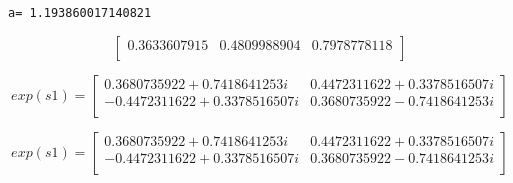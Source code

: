 \documentclass[11pt]{article}
\begin{document}
    \begin{Verbatim}[commandchars=\\\{\}]
a= 1.193860017140821
    \end{Verbatim}

    $$

\begin{bmatrix}
0.3633607915 & 0.4809988904 & 0.7978778118  \\
 \end{bmatrix}
$$

    
    $$
exp(s1)=
\begin{bmatrix}
0.3680735922 + 0.7418641253 i & 0.4472311622 + 0.3378516507 i  \\
 -0.4472311622 + 0.3378516507 i & 0.3680735922 - 0.7418641253 i  \\
 \end{bmatrix}
$$

    
    $$
exp(s1)=
\begin{bmatrix}
0.3680735922 + 0.7418641253 i & 0.4472311622 + 0.3378516507 i  \\
 -0.4472311622 + 0.3378516507 i & 0.3680735922 - 0.7418641253 i  \\
 \end{bmatrix}
$$

    

    
    
    
\end{document}
